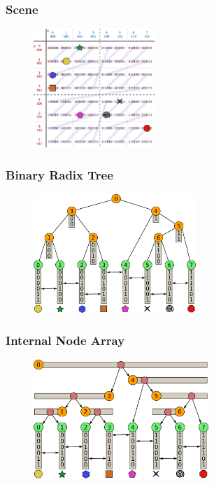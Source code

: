 \documentclass{beamer}
\begin{document}
\begin{frame}
  \frametitle{Scene}
\begin{figure}
\includegraphics[height=45mm]{Z-curve-primitives.png}
\end{figure}
\end{frame}

\begin{frame}
  \frametitle{Binary Radix Tree}
\begin{figure}
\includegraphics[height=45mm]{radix_tree.png}
\end{figure}
\end{frame}

\begin{frame}
  \frametitle{Internal Node Array}
\begin{figure}
\includegraphics[height=45mm]{radix_array.png}
\end{figure}
\end{frame}
\end{document}
